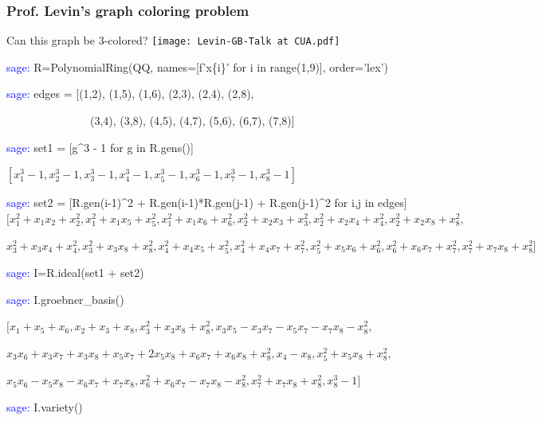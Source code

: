\documentclass{beamer}
\begin{document}
\begin{frame}[fragile]
\frametitle{Prof. Levin's graph coloring problem}
Can this graph be 3-colored?
\vskip 20pt
\texttt{[image: Levin-GB-Talk at CUA.pdf]}
\end{frame}

\begin{frame}

\begin{semiverbatim}
\scriptsize
\textcolor{blue}{sage:} R=PolynomialRing(QQ, names=[f'x\{i\}' for i in range(1,9)], order='lex')

\textcolor{blue}{sage:} edges = [(1,2), (1,5), (1,6), (2,3), (2,4), (2,8),

\ \ \ \ \ \ \ \ \ \ \ \ \ \ \        (3,4), (3,8), (4,5), (4,7), (5,6), (6,7), (7,8)]


\textcolor{blue}{sage:} set1 = [g\^{}3 - 1 for g in R.gens()]

$\left[x_{1}^{3} - 1, x_{2}^{3} - 1, x_{3}^{3} - 1, x_{4}^{3} - 1, x_{5}^{3} - 1, x_{6}^{3} - 1, x_{7}^{3} - 1, x_{8}^{3} - 1\right]$


\textcolor{blue}{sage:} set2 = [R.gen(i-1)\^{}2 + R.gen(i-1)*R.gen(j-1) + R.gen(j-1)\^{}2 for i,j in edges]
$[x_{1}^{2} + x_{1} x_{2} + x_{2}^{2}, x_{1}^{2} + x_{1} x_{5} + x_{5}^{2}, x_{1}^{2} + x_{1} x_{6} + x_{6}^{2}, x_{2}^{2} + x_{2} x_{3} + x_{3}^{2}, x_{2}^{2} + x_{2} x_{4} + x_{4}^{2}, x_{2}^{2} + x_{2} x_{8} + x_{8}^{2},$

$x_{3}^{2} + x_{3} x_{4} + x_{4}^{2}, x_{3}^{2} + x_{3} x_{8} + x_{8}^{2}, x_{4}^{2} + x_{4} x_{5} + x_{5}^{2}, x_{4}^{2} + x_{4} x_{7} + x_{7}^{2}, x_{5}^{2} + x_{5} x_{6} + x_{6}^{2}, x_{6}^{2} + x_{6} x_{7} + x_{7}^{2}, x_{7}^{2} + x_{7} x_{8} + x_{8}^{2}]$

\textcolor{blue}{sage:} I=R.ideal(set1 + set2)

\textcolor{blue}{sage:} I.groebner\_basis()

$[x_{1} + x_{5} + x_{6}, x_{2} + x_{3} + x_{8}, x_{3}^{2} + x_{3} x_{8} + x_{8}^{2}, x_{3} x_{5} - x_{3} x_{7} - x_{5} x_{7} - x_{7} x_{8} - x_{8}^{2},$

$x_{3} x_{6} + x_{3} x_{7} + x_{3} x_{8} + x_{5} x_{7} + 2 x_{5} x_{8} + x_{6} x_{7} + x_{6} x_{8} + x_{8}^{2}, x_{4} - x_{8}, x_{5}^{2} + x_{5} x_{8} + x_{8}^{2},$

$x_{5} x_{6} - x_{5} x_{8} - x_{6} x_{7} + x_{7} x_{8}, x_{6}^{2} + x_{6} x_{7} - x_{7} x_{8} - x_{8}^{2}, x_{7}^{2} + x_{7} x_{8} + x_{8}^{2}, x_{8}^{3} - 1]$

\textcolor{blue}{sage:} I.variety()


\end{semiverbatim}
\end{frame}
\end{document}
